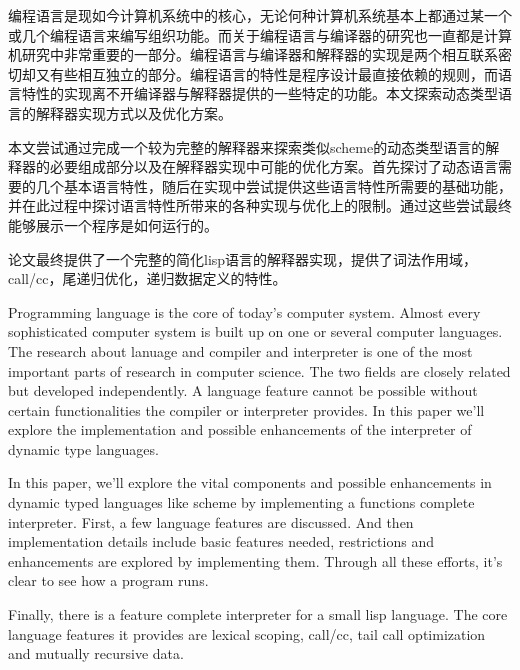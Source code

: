 
\begin{cabstract}
编程语言是现如今计算机系统中的核心，无论何种计算机系统基本上都通过某一个或几个编程语言来编写组织功能。而关于编程语言与编译器的研究也一直都是计算机研究中非常重要的一部分。编程语言与编译器和解释器的实现是两个相互联系密切却又有些相互独立的部分。编程语言的特性是程序设计最直接依赖的规则，而语言特性的实现离不开编译器与解释器提供的一些特定的功能。本文探索动态类型语言的解释器实现方式以及优化方案。

本文尝试通过完成一个较为完整的解释器来探索类似scheme的动态类型语言的解释器的必要组成部分以及在解释器实现中可能的优化方案。首先探讨了动态语言需要的几个基本语言特性，随后在实现中尝试提供这些语言特性所需要的基础功能，并在此过程中探讨语言特性所带来的各种实现与优化上的限制。通过这些尝试最终能够展示一个程序是如何运行的。

论文最终提供了一个完整的简化lisp语言的解释器实现，提供了词法作用域，call/cc，尾递归优化，递归数据定义的特性。
\end{cabstract}

\begin{eabstract}
Programming language is the core of today's computer system. Almost every sophisticated computer system is built up on one or several computer languages. The research about lanuage and compiler and interpreter is one of the most important parts of research in computer science. The two fields are closely related but developed independently. A language feature cannot be possible without certain functionalities the compiler or interpreter provides. In this paper we'll explore the implementation and possible enhancements of the interpreter of dynamic type languages.

In this paper, we'll explore the vital components and possible enhancements in dynamic typed languages like scheme by implementing a functions complete interpreter. First, a few language features are discussed. And then implementation details include basic features needed, restrictions and enhancements are explored by implementing them. Through all these efforts, it's clear to see how a program runs.

Finally, there is a feature complete interpreter for a small lisp language. The core language features it provides are lexical scoping, call/cc, tail call optimization and mutually recursive data.
\end{eabstract}
